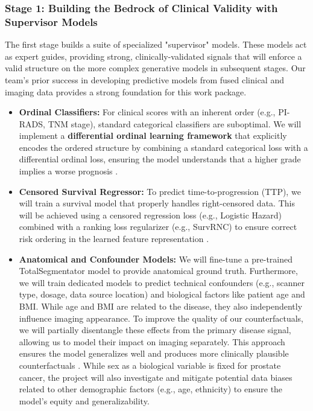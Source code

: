\documentclass[11pt, a4paper]{article}
\begin{document}
\subsubsection{Stage 1: Building the Bedrock of Clinical Validity with Supervisor Models}
The first stage builds a suite of specialized "supervisor" models. These models act as expert guides, providing strong, clinically-validated signals that will enforce a valid structure on the more complex generative models in subsequent stages. Our team's prior success in developing predictive models from fused clinical and imaging data provides a strong foundation for this work package.
\begin{itemize}
    \item \textbf{Ordinal Classifiers:} For clinical scores with an inherent order (e.g., PI-RADS, TNM stage), standard categorical classifiers are suboptimal. We will implement a \textbf{differential ordinal learning framework} that explicitly encodes the ordered structure by combining a standard categorical loss with a differential ordinal loss, ensuring the model understands that a higher grade implies a worse prognosis \cite{LeeByeon2025, GrisiKartasalo2025}.
    \item \textbf{Censored Survival Regressor:} To predict time-to-progression (TTP), we will train a survival model that properly handles right-censored data. This will be achieved using a censored regression loss (e.g., Logistic Hazard) combined with a ranking loss regularizer (e.g., SurvRNC) to ensure correct risk ordering in the learned feature representation \cite{GaoLi2019, RivailVogl2023, SaeedRidzuan2024}.
    \item \textbf{Anatomical and Confounder Models:} We will fine-tune a pre-trained TotalSegmentator model \cite{Wasserthal_2023} to provide anatomical ground truth. Furthermore, we will train dedicated models to predict technical confounders (e.g., scanner type, dosage, data source location) and biological factors like patient age and BMI. While age and BMI are related to the disease, they also independently influence imaging appearance. To improve the quality of our counterfactuals, we will partially disentangle these effects from the primary disease signal, allowing us to model their impact on imaging separately. This approach ensures the model generalizes well and produces more clinically plausible counterfactuals \cite{PuglisiAlexander2025, ZhangHager2025}. While sex as a biological variable is fixed for prostate cancer, the project will also investigate and mitigate potential data biases related to other demographic factors (e.g., age, ethnicity) to ensure the model's equity and generalizability.
\end{itemize}
\end{document}
